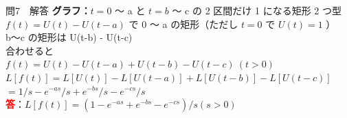 \documentclass[professionalfonts]{beamer}
\begin{document}
\begin{frame}{問7　解答}
  \textbf{グラフ：}$t=0$ 〜 a と $t=b$ 〜 c の 2 区間だけ 1 になる矩形 2 つ型\\[0.3em]
  $f(t) = U(t) - U(t-a)$ で 0 〜 a の矩形（ただし $t=0$ で $U(t)=1$ ）\\[4pt]
  b〜c の矩形は U(t-b) - U(t-c)\\[4pt]
  合わせると\\[4pt]
  $f(t) = U(t) - U(t-a) + U(t-b) - U(t-c) \ (t > 0)$\\[4pt]
  $L[f(t)] = L[U(t)] - L[U(t-a)] + L[U(t-b)] - L[U(t-c)]$\\[4pt]
  $       = 1/s - e^{-as}/s + e^{-bs}/s - e^{-cs}/s$
  \\[8pt]\textcolor{red}{\textbf{答}}：$L[f(t)] = (1 - e^{-as} + e^{-bs} - e^{-cs})/s  (s > 0)$
\end{frame}
\end{document}
